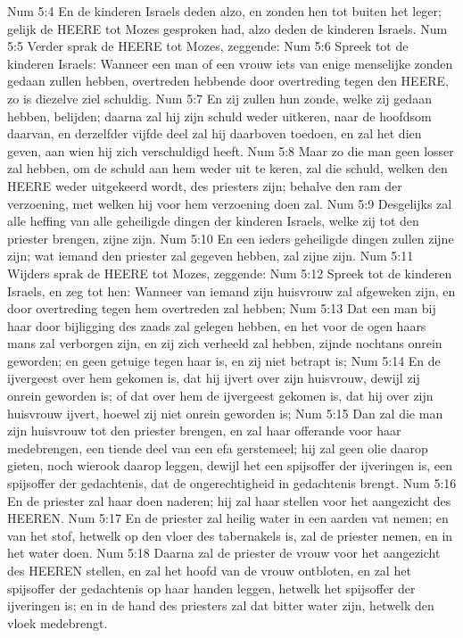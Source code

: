 Num 5:4  En de kinderen Israels deden alzo, en zonden hen tot buiten het leger; gelijk de HEERE tot Mozes gesproken had, alzo deden de kinderen Israels.
Num 5:5  Verder sprak de HEERE tot Mozes, zeggende:
Num 5:6  Spreek tot de kinderen Israels: Wanneer een man of een vrouw iets van enige menselijke zonden gedaan zullen hebben, overtreden hebbende door overtreding tegen den HEERE, zo is diezelve ziel schuldig.
Num 5:7  En zij zullen hun zonde, welke zij gedaan hebben, belijden; daarna zal hij zijn schuld weder uitkeren, naar de hoofdsom daarvan, en derzelfder vijfde deel zal hij daarboven toedoen, en zal het dien geven, aan wien hij zich verschuldigd heeft.
Num 5:8  Maar zo die man geen losser zal hebben, om de schuld aan hem weder uit te keren, zal die schuld, welken den HEERE weder uitgekeerd wordt, des priesters zijn; behalve den ram der verzoening, met welken hij voor hem verzoening doen zal.
Num 5:9  Desgelijks zal alle heffing van alle geheiligde dingen der kinderen Israels, welke zij tot den priester brengen, zijne zijn.
Num 5:10  En een ieders geheiligde dingen zullen zijne zijn; wat iemand den priester zal gegeven hebben, zal zijne zijn.
Num 5:11  Wijders sprak de HEERE tot Mozes, zeggende:
Num 5:12  Spreek tot de kinderen Israels, en zeg tot hen: Wanneer van iemand zijn huisvrouw zal afgeweken zijn, en door overtreding tegen hem overtreden zal hebben;
Num 5:13  Dat een man bij haar door bijligging des zaads zal gelegen hebben, en het voor de ogen haars mans zal verborgen zijn, en zij zich verheeld zal hebben, zijnde nochtans onrein geworden; en geen getuige tegen haar is, en zij niet betrapt is;
Num 5:14  En de ijvergeest over hem gekomen is, dat hij ijvert over zijn huisvrouw, dewijl zij onrein geworden is; of dat over hem de ijvergeest gekomen is, dat hij over zijn huisvrouw ijvert, hoewel zij niet onrein geworden is;
Num 5:15  Dan zal die man zijn huisvrouw tot den priester brengen, en zal haar offerande voor haar medebrengen, een tiende deel van een efa gerstemeel; hij zal geen olie daarop gieten, noch wierook daarop leggen, dewijl het een spijsoffer der ijveringen is, een spijsoffer der gedachtenis, dat de ongerechtigheid in gedachtenis brengt.
Num 5:16  En de priester zal haar doen naderen; hij zal haar stellen voor het aangezicht des HEEREN.
Num 5:17  En de priester zal heilig water in een aarden vat nemen; en van het stof, hetwelk op den vloer des tabernakels is, zal de priester nemen, en in het water doen.
Num 5:18  Daarna zal de priester de vrouw voor het aangezicht des HEEREN stellen, en zal het hoofd van de vrouw ontbloten, en zal het spijsoffer der gedachtenis op haar handen leggen, hetwelk het spijsoffer der ijveringen is; en in de hand des priesters zal dat bitter water zijn, hetwelk den vloek medebrengt.
